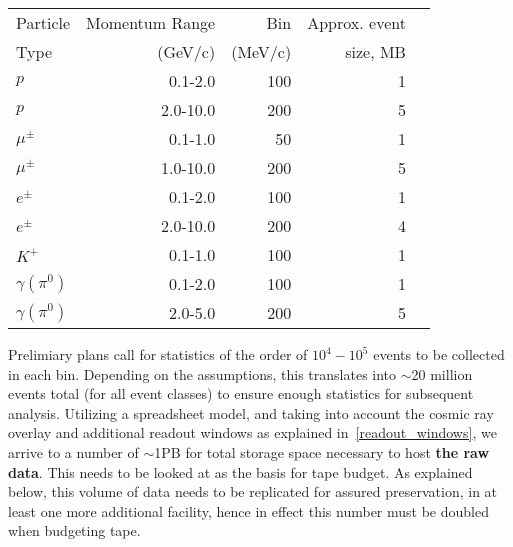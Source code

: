 \begin{center}
\begin{tabular}[h]{|l|r|r|r|r|}
  \hline
 Particle & Momentum Range& Bin         & Approx. event \\ %
 Type    &  (GeV/c)                 & (MeV/c) & size, MB \\ %
  \hline
  $p$ & 0.1-2.0 & 100 & 1 \\ %
  $p$ & 2.0-10.0 & 200 & 5 \\ %
  \hline
   $\mu^{\pm}$ & 0.1-1.0 & 50  & 1 \\ %
   $\mu^{\pm}$ & 1.0-10.0 & 200  & 5 \\ %
  \hline
   $e^{\pm}$ & 0.1-2.0 & 100 & 1  \\ %
   $e^{\pm}$ & 2.0-10.0 & 200  & 4 \\ %
  \hline
   $K^{+}$ & 0.1-1.0 & 100 & 1  \\ %
  \hline
   $\gamma(\pi^{0})$ & 0.1-2.0 & 100  & 1 \\ %
   $\gamma(\pi^{0})$ & 2.0-5.0 & 200  & 5 \\ %
  \hline
\end{tabular}
\end{center}

Prelimiary plans call for statistics of the order of $10^4 - 10^5$  events to be collected in each bin.
Depending on the assumptions, this translates into $\sim$20 million events total (for all event classes) to ensure enough statistics for subsequent analysis. Utilizing
a spreadsheet model, and taking into account the cosmic ray overlay and additional readout windows as explained in~\ref{readout_windows}, we arrive to a number
of $\sim$1PB for total storage space necessary to host \textbf{the raw data}. This needs to be looked at as the basis for tape budget. As explained below, this
volume of data needs to be replicated for assured preservation, in at least one more additional facility, hence in effect this number must be doubled when budgeting
tape.


